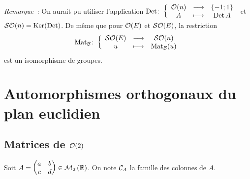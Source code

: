 \emph{Remarque~:} On aurait pu utiliser l'application $\fonction{\Det}{\Orth{n}}{\{-1;1\}}{A}{\Det A}$ et $\SOrth{n}=\Ker(\Det)$. De même que pour $\Orth{E}$ et $\SOrth{E}$, la restriction
\begin{equation}
 \fonction{\Mat_\B}{\SOrth{E}}{\SOrth{n}}{u}{\Mat_\B(u)} 
\end{equation}
est un isomorphisme de groupes. 

\section{Automorphismes orthogonaux du plan euclidien}

\subsection{Matrices de $\Orth{2}$}

Soit $A=\begin{pmatrix} a & b \\ c & d \end{pmatrix} \in \Mn{2}{\R}$. On note $\courbe_A$ la famille des colonnes de $A$.


